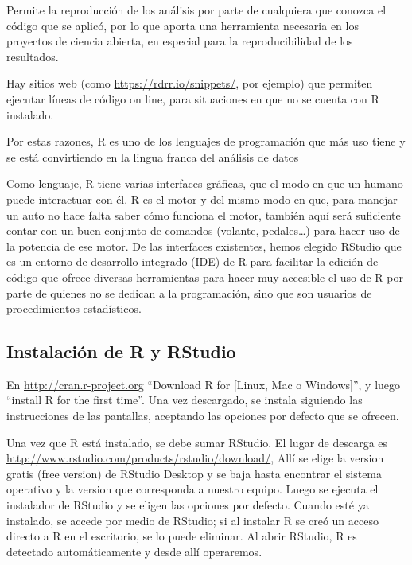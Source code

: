\documentclass[]{book}
\begin{document}
Permite la reproducción de los análisis por parte de cualquiera que conozca el código que se aplicó, por lo que aporta una herramienta necesaria en los proyectos de ciencia abierta, en especial para la reproducibilidad de los resultados.

Hay sitios web (como \url{https://rdrr.io/snippets/}, por ejemplo) que permiten ejecutar líneas de código on line, para situaciones en que no se cuenta con R instalado.

Por estas razones, R es uno de los lenguajes de programación que más uso tiene y se está convirtiendo en la lingua franca del análisis de datos

Como lenguaje, R tiene varias interfaces gráficas, que el modo en que un humano puede interactuar con él. R es el motor y del mismo modo en que, para manejar un auto no hace falta saber cómo funciona el motor, también aquí será suficiente contar con un buen conjunto de comandos (volante, pedales\ldots{}) para hacer uso de la potencia de ese motor. De las interfaces existentes, hemos elegido RStudio que es un entorno de desarrollo integrado (IDE) de R para facilitar la edición de código que ofrece diversas herramientas para hacer muy accesible el uso de R por parte de quienes no se dedican a la programación, sino que son usuarios de procedimientos estadísticos.

\hypertarget{instalaciuxf3n-de-r-y-rstudio}{%
\subsection{Instalación de R y RStudio}\label{instalaciuxf3n-de-r-y-rstudio}}

En \url{http://cran.r-project.org} ``Download R for {[}Linux, Mac o Windows{]}'', y luego ``install R for the first time''. Una vez descargado, se instala siguiendo las instrucciones de las pantallas, aceptando las opciones por defecto que se ofrecen.

Una vez que R está instalado, se debe sumar RStudio. El lugar de descarga es \url{http://www.rstudio.com/products/rstudio/download/}, Allí se elige la version gratis (free version) de RStudio Desktop y se baja hasta encontrar el sistema operativo y la version que corresponda a nuestro equipo. Luego se ejecuta el instalador de RStudio y se eligen las opciones por defecto. Cuando esté ya instalado, se accede por medio de RStudio; si al instalar R se creó un acceso directo a R en el escritorio, se lo puede eliminar. Al abrir RStudio, R es detectado automáticamente y desde allí operaremos.
\end{document}

